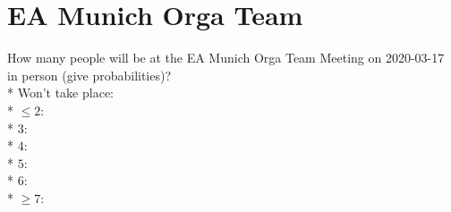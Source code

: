 \documentclass{article}
\begin{document}
\section*{EA Munich Orga Team}

How many people will be at the EA Munich Orga Team Meeting on 2020-03-17
in person (give probabilities)?\\*
Won't take place: \null\hfill\underline{\hspace{5cm}}\\*
$\le 2$: \null\hfill\underline{\hspace{5cm}}\\*
$3$: \null\hfill\underline{\hspace{5cm}}\\*
$4$: \null\hfill\underline{\hspace{5cm}}\\*
$5$: \null\hfill\underline{\hspace{5cm}}\\*
$6$: \null\hfill\underline{\hspace{5cm}}\\*
$\ge 7$: \null\hfill\underline{\hspace{5cm}}
\end{document}
